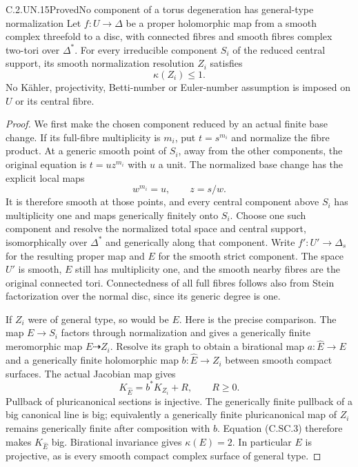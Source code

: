 \begin{statement}{C.2.UN.15}{Proved}{No component of a torus degeneration has general-type normalization}
Let $f:U\to\Delta$ be a proper holomorphic map from
a smooth complex threefold to a disc, with connected
fibres and smooth fibres complex two-tori over
$\Delta^*$. For every irreducible component $S_i$
of the reduced central support, its smooth
normalization resolution $Z_i$ satisfies
\[
                            \kappa(Z_i)\le1.
 \tag{C.SC.1}
\]
No K\"ahler, projectivity, Betti-number or Euler-number
assumption is imposed on $U$ or its central fibre.
\end{statement}
\begin{proof}
We first make the chosen component reduced by an
actual finite base change. If its full-fibre
multiplicity is $m_i$, put $t=s^{m_i}$ and normalize
the fibre product. At a generic smooth point of
$S_i$, away from the other components, the original
equation is $t=u z^{m_i}$ with $u$ a unit. The
normalized base change has the explicit local maps
\[
                  w^{m_i}=u,\qquad z=s/w.
 \tag{C.SC.2}
\]
It is therefore smooth at those points, and every
central component above $S_i$ has multiplicity one
and maps generically finitely onto $S_i$. Choose one
such component and resolve the normalized total
space and central support, isomorphically over
$\Delta^*$ and generically along that component.
Write $f':U'\to\Delta_s$ for the resulting proper
map and $E$ for the smooth strict component. The
space $U'$ is smooth, $E$ still has multiplicity
one, and the smooth nearby fibres are the original
connected tori. Connectedness of all full fibres
follows also from Stein factorization over the
normal disc, since its generic degree is one.

If $Z_i$ were of general type, so would be $E$.
Here is the precise comparison. The map $E\to S_i$
factors through normalization and gives a
generically finite meromorphic map $E\dashrightarrow
Z_i$. Resolve its graph to obtain a birational
map $a:\widehat E\to E$ and a generically finite
holomorphic map $b:\widehat E\to Z_i$ between
smooth compact surfaces. The actual Jacobian map
gives
\[
                 K_{\widehat E}=b^*K_{Z_i}+R,
                 \qquad R\ge0.                 \tag{C.SC.3}
\]
Pullback of pluricanonical sections is injective.
The generically finite pullback of a big canonical
line is big; equivalently a generically finite
pluricanonical map of $Z_i$ remains generically
finite after composition with $b$. Equation
(C.SC.3) therefore makes $K_{\widehat E}$ big.
Birational invariance gives $\kappa(E)=2$.
In particular $E$ is projective, as is every
smooth compact complex surface of general type.


\end{proof}
